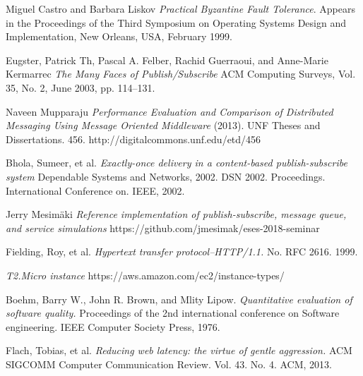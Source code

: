 \documentclass[conference]{IEEEtran}
\begin{document}
{}

\begin{thebibliography}{9}
Miguel Castro and Barbara Liskov
\textit{Practical Byzantine Fault Tolerance}. 
Appears in the Proceedings of the Third Symposium on Operating Systems Design and Implementation, New Orleans, USA, February 1999.

Eugster, Patrick Th, Pascal A. Felber, Rachid Guerraoui, and Anne-Marie Kermarrec
\textit{The Many Faces of Publish/Subscribe}
ACM Computing Surveys, Vol. 35, No. 2, June 2003, pp. 114–131.
 
Naveen Mupparaju
\textit{Performance Evaluation and Comparison of Distributed Messaging Using Message Oriented Middleware}
(2013). UNF Theses and Dissertations. 456.
http://digitalcommons.unf.edu/etd/456

Bhola, Sumeer, et al.
\textit{Exactly-once delivery in a content-based publish-subscribe system}
Dependable Systems and Networks, 2002. DSN 2002. Proceedings. International Conference on. IEEE, 2002.

Jerry Mesimäki
\textit{Reference implementation of publish-subscribe, message queue, and service simulations}
https://github.com/jmesimak/eses-2018-seminar

Fielding, Roy, et al.
\textit{Hypertext transfer protocol--HTTP/1.1.}
No. RFC 2616. 1999.

\textit{T2.Micro instance}
https://aws.amazon.com/ec2/instance-types/

Boehm, Barry W., John R. Brown, and Mlity Lipow.
\textit{Quantitative evaluation of software quality.}
Proceedings of the 2nd international conference on Software engineering. IEEE Computer Society Press, 1976.

Flach, Tobias, et al.
\textit{Reducing web latency: the virtue of gentle aggression.}
ACM SIGCOMM Computer Communication Review. Vol. 43. No. 4. ACM, 2013.


\end{thebibliography}
\end{document}
